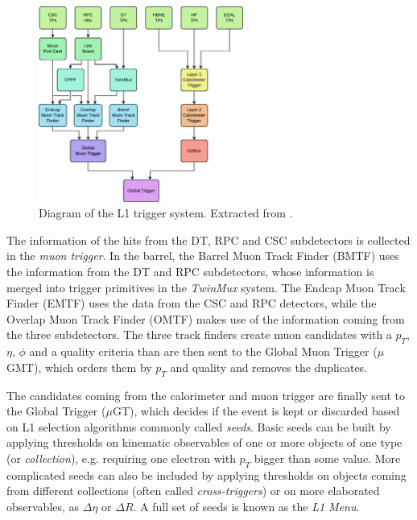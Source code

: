 \documentclass[../main.tex]{subfiles}
\begin{document}
\begin{figure}[h!]
\begin{center}
\includegraphics[width=0.6\textwidth]{Images/l1trigger}
\end{center}
\caption{Diagram of the L1 trigger system. Extracted from \cite{intro:l1_13tev}.}
\label{intro:exp:l1trigger_sketch}
\end{figure}



The information of the hits from the DT, RPC and CSC subdetectors is collected in the \textit{muon trigger}. In the barrel, the Barrel Muon Track Finder (BMTF) uses the information from the DT and RPC subdetectors, whose information is merged into trigger primitives in the \textit{TwinMux} system. The Endcap Muon Track Finder (EMTF) uses the data from the CSC and RPC detectors, while the Overlap Muon Track Finder (OMTF) makes use of the information coming from the three subdetectors. The three track finders create muon candidates with a $p_T$, $\eta$, $\phi$ and a quality criteria than are then sent to the Global Muon Trigger ($\mu$GMT), which orders them by $p_T$ and quality and removes the duplicates.

The candidates coming from the calorimeter and muon trigger are finally sent to the Global Trigger ($\mu$GT), which decides if the event is kept or discarded based on L1 selection algorithms commonly called \textit{seeds}. Basic seeds can be built by applying thresholds on kinematic observables of one or more objects of one type (or \textit{collection}), e.g. requiring one electron with $p_T$ bigger than some value. More complicated seeds can also be included by applying thresholds on objects coming from different collections (often called \textit{cross-triggers}) or on more elaborated observables, as $\Delta\eta$ or $\Delta R$. A full set of seeds is known as the \textit{L1 Menu}.
\end{document}
